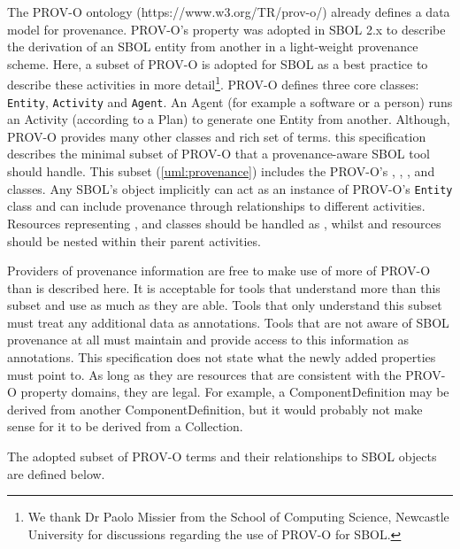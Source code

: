 {The PROV-O ontology (https://www.w3.org/TR/prov-o/) already defines a data model for provenance. PROV-O's  property was adopted in SBOL 2.x to describe the derivation of an SBOL entity from another in a light-weight provenance scheme.  Here, a subset of PROV-O is adopted for SBOL as a best practice to describe these activities in more detail\footnote{We thank Dr Paolo Missier from the School of Computing Science, Newcastle University for discussions regarding the use of PROV-O for SBOL.}. PROV-O defines three core classes: \texttt{Entity}, \texttt{Activity} and \texttt{Agent}. An Agent (for example a software or a person) runs an Activity (according to a Plan) to generate one Entity from another. Although, PROV-O provides many other classes and rich set of terms. this specification describes the minimal subset of PROV-O that a provenance-aware SBOL tool should handle. This subset (\ref{uml:provenance}) includes the PROV-O's , , ,  and  classes. Any SBOL's  object implicitly can act as an instance of PROV-O's \texttt{Entity} class and can include provenance through relationships to different activities. Resources representing ,  and  classes should be handled as , whilst  and  resources should be nested within their parent activities. 


Providers of provenance information are free to make use of more of PROV-O than is described here. It is acceptable for tools that understand more than this subset and use as much as they are able. Tools that only understand this subset must treat any additional data as annotations. Tools that are not aware of SBOL provenance at all must maintain and provide access to this information as annotations. This specification does not state what the newly added properties must point to. As long as they are resources that are consistent with the PROV-O property domains, they are legal. For example, a ComponentDefinition may be derived from another ComponentDefinition, but it would probably not make sense for it to be derived from a Collection.

The adopted subset of PROV-O terms and their relationships to SBOL objects are defined below.

}
